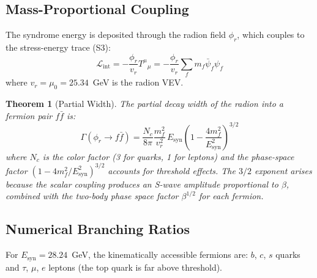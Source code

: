 \documentclass[11pt,a4paper]{article}
\newtheorem{theorem}{Theorem}[section]
\theoremstyle{definition}
\theoremstyle{remark}
\newcommand{\murad}{\mu_0}
\newcommand{\Esyn}{E_{\mathrm{syn}}}
\newcommand{\LL}{\mathcal{L}}
\begin{document}
\subsection{Mass-Proportional Coupling}

The syndrome energy is deposited through the radion field $\phi_r$, which couples to the stress-energy trace (S3):
\begin{equation}
\LL_{\mathrm{int}} = -\frac{\phi_r}{v_r} T^\mu{}_\mu = -\frac{\phi_r}{v_r} \sum_f m_f \bar{\psi}_f \psi_f
\end{equation}
where $v_r = \murad = 25.34$~GeV is the radion VEV.

\begin{theorem}[Partial Width]
\label{thm:width}
The partial decay width of the radion into a fermion pair $f\bar{f}$ is:
\begin{equation}
\Gamma(\phi_r \to f\bar{f}) = \frac{N_c}{8\pi} \frac{m_f^2}{v_r^2}\, \Esyn \left(1 - \frac{4m_f^2}{\Esyn^2}\right)^{3/2}
\end{equation}
where $N_c$ is the color factor (3 for quarks, 1 for leptons) and the phase-space factor $(1 - 4m_f^2/\Esyn^2)^{3/2}$ accounts for threshold effects. The $3/2$ exponent arises because the scalar coupling produces an S-wave amplitude proportional to $\beta$, combined with the two-body phase space factor $\beta^{1/2}$ for each fermion.
\end{theorem}

\subsection{Numerical Branching Ratios}

For $\Esyn = 28.24$~GeV, the kinematically accessible fermions are: $b$, $c$, $s$ quarks and $\tau$, $\mu$, $e$ leptons (the top quark is far above threshold).
\end{document}
